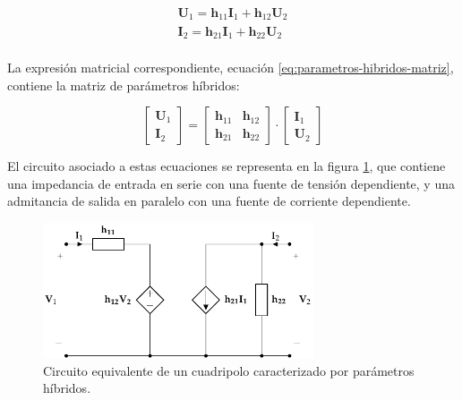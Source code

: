 \begin{equation}
  \label{eq:parametros-hibridos}
  \begin{array}{l}
    \mathbf{U}_1 = \mathbf{h}_{11} \mathbf{I}_1 + \mathbf{h}_{12} \mathbf{U}_2\\
    \mathbf{I}_2 = \mathbf{h}_{21} \mathbf{I}_1 + \mathbf{h}_{22} \mathbf{U}_2\\
  \end{array}
\end{equation}

La expresión matricial correspondiente, ecuación \ref{eq:parametros-hibridos-matriz}, contiene la matriz de parámetros híbridos:

\begin{equation}
  \label{eq:parametros-hibridos-matriz}
  \left[
    \begin{array}{c}
      \mathbf{U}_1\\
      \mathbf{I}_2
    \end{array}
  \right] = \left[
    \begin{array}{cc}
      \mathbf{h}_{11} & \mathbf{h}_{12}\\
      \mathbf{h}_{21} & \mathbf{h}_{22}
    \end{array}
  \right] \cdot \left[
    \begin{array}{c}
      \mathbf{I}_1\\
      \mathbf{U}_2
    \end{array}
  \right]
\end{equation}

El circuito asociado a estas ecuaciones se representa en la figura \ref{fig:circuito-equivalente-hibridos}, que contiene una impedancia de entrada en serie con una fuente de tensión dependiente, y una admitancia de salida en paralelo con una fuente de corriente dependiente.

\begin{figure}[H]
  \centering
  \includegraphics[height=4cm]{../figs/circuitoEquivalenteH.pdf}
  \caption{Circuito equivalente de un cuadripolo caracterizado por parámetros híbridos.}
  \label{fig:circuito-equivalente-hibridos}
\end{figure}


